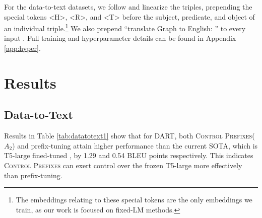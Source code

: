 \documentclass[11pt]{article}
\newcommand{\control}{\textsc{Control Prefixes}\xspace}
\begin{document}
For the data-to-text datasets, we follow \citet{ribeiro} and linearize the triples, prepending the special tokens <H>, <R>, and <T> before the subject, predicate, and object of an individual triple.\footnote{The embeddings relating to these special tokens are the only embeddings we
train, as our work is focused on fixed-LM methods.} We also prepend \enquote{translate Graph to English: } to every input \citep{T5}. Full training and hyperparameter details can be found in Appendix \ref{app:hyper}.


\section{Results}



\subsection{Data-to-Text}
Results in Table \ref{tab:datatotext1} show that for DART, both \control ($A_2$) and prefix-tuning attain higher
performance than the current SOTA, which is T5-large fined-tuned \citep{dart}, by 1.29 and 0.54 BLEU points respectively. This indicates \control can exert control over the frozen T5-large more effectively than prefix-tuning.
\end{document}
